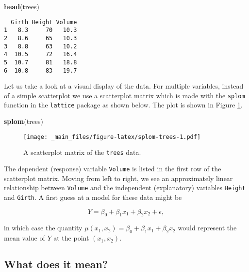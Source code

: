 \documentclass[]{book}
\newenvironment{Shaded}{\begin{snugshade}}{\end{snugshade}}
\newcommand{\KeywordTok}[1]{\textcolor[rgb]{0.13,0.29,0.53}{\textbf{{#1}}}}
\newcommand{\NormalTok}[1]{{#1}}
\numberwithin{equation}{chapter}
\numberwithin{figure}{chapter}
\theoremstyle{plain}
\theoremstyle{definition}
\theoremstyle{remark}
\theoremstyle{definition}
\theoremstyle{definition}
\theoremstyle{remark}
\begin{document}
\begin{Shaded}
\begin{Highlighting}[]
\KeywordTok{head}\NormalTok{(trees)}
\end{Highlighting}
\end{Shaded}

\begin{verbatim}
  Girth Height Volume
1   8.3     70   10.3
2   8.6     65   10.3
3   8.8     63   10.2
4  10.5     72   16.4
5  10.7     81   18.8
6  10.8     83   19.7
\end{verbatim}

Let us take a look at a visual display of the data. For multiple
variables, instead of a simple scatterplot we use a scatterplot matrix
which is made with the \texttt{splom} function in the \texttt{lattice}
package \autocite{lattice} as shown below. The plot is shown in Figure
\ref{fig:splom-trees}.

\begin{Shaded}
\begin{Highlighting}[]
\KeywordTok{splom}\NormalTok{(trees)}
\end{Highlighting}
\end{Shaded}

\begin{figure}[htbp]
\centering
\texttt{[image: \_main\_files/figure-latex/splom-trees-1.pdf]}
\caption{\label{fig:splom-trees}\small A scatterplot matrix of the \texttt{trees}
data.}
\end{figure}




The dependent (response) variable \texttt{Volume} is listed in the first
row of the scatterplot matrix. Moving from left to right, we see an
approximately linear relationship between \texttt{Volume} and the
independent (explanatory) variables \texttt{Height} and \texttt{Girth}.
A first guess at a model for these data might be

\begin{equation}
Y=\beta_{0}+\beta_{1}x_{1}+\beta_{2}x_{2}+\epsilon,
\end{equation}

in which case the quantity
\(\mu(x_{1},x_{2})=\beta_{0}+\beta_{1}x_{1}+\beta_{2}x_{2}\) would
represent the mean value of \(Y\) at the point \((x_{1},x_{2})\).

\subsection{What does it mean?}\label{what-does-it-mean}
\end{document}

